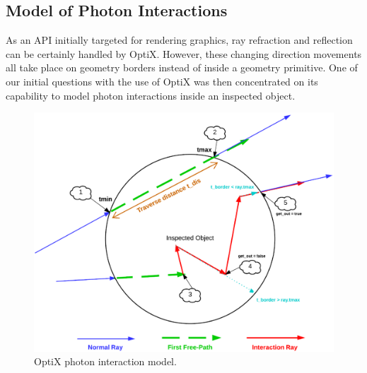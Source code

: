 \subsection{Model of Photon Interactions}
As an API initially targeted for rendering graphics, ray refraction and reflection can be certainly handled by OptiX. However, these changing direction movements all take place on geometry borders instead of inside a geometry primitive. One of our initial questions with the use of OptiX was then concentrated on its capability to model photon interactions inside an inspected object.
\begin{figure}[htbp]
		\includegraphics[width=\textwidth,height=\textheight,keepaspectratio]{Figures/model.png}
	\caption{OptiX photon interaction model.}%
	\label{fig:model}
\end{figure}\\

